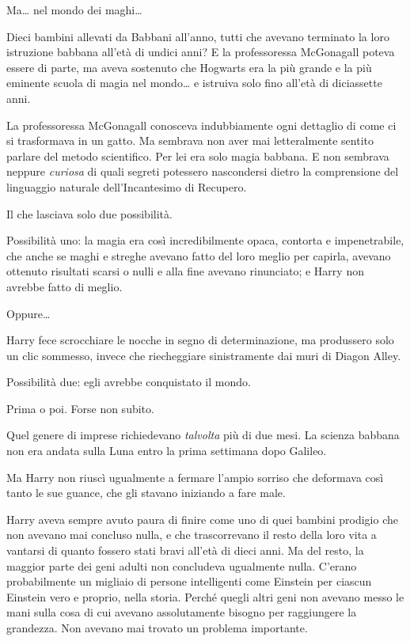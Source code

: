 Ma… nel mondo dei maghi…

Dieci bambini allevati da Babbani all’anno, tutti che avevano terminato la loro istruzione babbana all’età di undici anni? E la professoressa McGonagall poteva essere di parte, ma aveva sostenuto che Hogwarts era la più grande e la più eminente scuola di magia nel mondo… e istruiva solo fino all’età di diciassette anni.

La professoressa McGonagall conosceva indubbiamente ogni dettaglio di come ci si trasformava in un gatto. Ma sembrava non aver mai letteralmente sentito parlare del metodo scientifico. Per lei era solo magia babbana. E non sembrava neppure \textit{curiosa} di quali segreti potessero nascondersi dietro la comprensione del linguaggio naturale dell’Incantesimo di Recupero.

Il che lasciava solo due possibilità.

Possibilità uno: la magia era così incredibilmente opaca, contorta e impenetrabile, che anche se maghi e streghe avevano fatto del loro meglio per capirla, avevano ottenuto risultati scarsi o nulli e alla fine avevano rinunciato; e Harry non avrebbe fatto di meglio.

Oppure…

Harry fece scrocchiare le nocche in segno di determinazione, ma produssero solo un clic sommesso, invece che riecheggiare sinistramente dai muri di Diagon Alley.

Possibilità due: egli avrebbe conquistato il mondo.

Prima o poi. Forse non subito.

Quel genere di imprese richiedevano \textit{talvolta} più di due mesi. La scienza babbana non era andata sulla Luna entro la prima settimana dopo Galileo.

Ma Harry non riuscì ugualmente a fermare l’ampio sorriso che deformava così tanto le sue guance, che gli stavano iniziando a fare male.

Harry aveva sempre avuto paura di finire come uno di quei bambini prodigio che non avevano mai concluso nulla, e che trascorrevano il resto della loro vita a vantarsi di quanto fossero stati bravi all’età di dieci anni. Ma del resto, la maggior parte dei geni adulti non concludeva ugualmente nulla. C’erano probabilmente un migliaio di persone intelligenti come Einstein per ciascun Einstein vero e proprio, nella storia. Perché quegli altri geni non avevano messo le mani sulla cosa di cui avevano assolutamente bisogno per raggiungere la grandezza. Non avevano mai trovato un problema importante.

